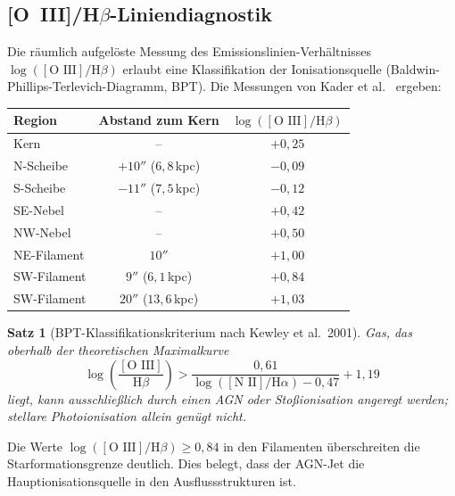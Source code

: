 ﻿\documentclass[12pt,a4paper]{report}
\newtheorem{theorem}{Satz}[chapter]
\begin{document}
\subsection{[O~III]/H$\beta$-Liniendiagnostik}

Die räumlich aufgelöste Messung des Emissionslinien-Verhältnisses $\log([\text{O~III}]/\text{H}\beta)$ erlaubt eine Klassifikation der Ionisationsquelle (Baldwin-Phillips-Terlevich-Diagramm, BPT). Die Messungen von Kader et al.\ \cite{kader2026} ergeben:

\begin{center}
	\begin{tabular}{lcc}
		\hline
		\textbf{Region} & \textbf{Abstand zum Kern} & $\log([\text{O III}]/\text{H}\beta)$ \\
		\hline
		Kern & -- & $+0{,}25$ \\
		N-Scheibe & $+10''$ ($6{,}8$\,kpc) & $-0{,}09$ \\
		S-Scheibe & $-11''$ ($7{,}5$\,kpc) & $-0{,}12$ \\
		SE-Nebel & -- & $+0{,}42$ \\
		NW-Nebel & -- & $+0{,}50$ \\
		NE-Filament & $10''$ & $+1{,}00$ \\
		SW-Filament & $9''$ ($6{,}1$\,kpc) & $+0{,}84$ \\
		SW-Filament & $20''$ ($13{,}6$\,kpc) & $+1{,}03$ \\
		\hline
	\end{tabular}
\end{center}

\begin{theorem}[BPT-Klassifikationskriterium nach Kewley et al.\ 2001]
	Gas, das oberhalb der theoretischen Maximalkurve
	\begin{equation}
		\log\left(\frac{[\text{O III}]}{\text{H}\beta}\right) > \frac{0{,}61}{\log([\text{N~II}]/\text{H}\alpha) - 0{,}47} + 1{,}19
	\end{equation}
	liegt, kann ausschließlich durch einen AGN oder Stoßionisation angeregt werden; stellare Photoionisation allein genügt nicht.
\end{theorem}

Die Werte $\log([\text{O III}]/\text{H}\beta) \geq 0{,}84$ in den Filamenten überschreiten die Starformations\-grenze deutlich. Dies belegt, dass der AGN-Jet die Hauptionisationsquelle in den Ausfluss\-strukturen ist.
\end{document}
